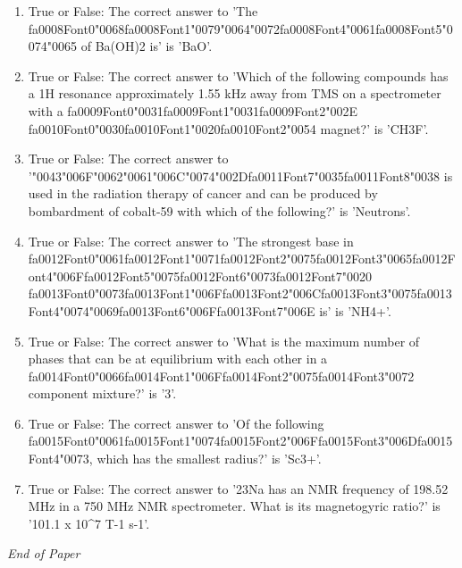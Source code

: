 \documentclass[12pt]{article}
\begin{document}
\begin{enumerate}[label=\arabic*.]
\item True or False: The correct answer to 'The {\csname fa0008Font0\endcsname\char"0068}{\csname fa0008Font1\endcsname\char"0079}{\char"0064}{\char"0072}{\csname fa0008Font4\endcsname\char"0061}{\csname fa0008Font5\endcsname\char"0074}{\char"0065} of Ba(OH)2 is' is 'BaO'.
\item True or False: The correct answer to 'Which of the following compounds has a 1H resonance approximately 1.55 kHz away from TMS on a spectrometer with a {\csname fa0009Font0\endcsname\char"0031}{\csname fa0009Font1\endcsname\char"0031}{\csname fa0009Font2\endcsname\char"002E} {\csname fa0010Font0\endcsname\char"0030}{\csname fa0010Font1\endcsname\char"0020}{\csname fa0010Font2\endcsname\char"0054} magnet?' is 'CH3F'.
\item True or False: The correct answer to '{\char"0043}{\char"006F}{\char"0062}{\char"0061}{\char"006C}{\char"0074}{\char"002D}{\csname fa0011Font7\endcsname\char"0035}{\csname fa0011Font8\endcsname\char"0038} is used in the radiation therapy of cancer and can be produced by bombardment of cobalt-59 with which of the following?' is 'Neutrons'.
\item True or False: The correct answer to 'The strongest base in {\csname fa0012Font0\endcsname\char"0061}{\csname fa0012Font1\endcsname\char"0071}{\csname fa0012Font2\endcsname\char"0075}{\csname fa0012Font3\endcsname\char"0065}{\csname fa0012Font4\endcsname\char"006F}{\csname fa0012Font5\endcsname\char"0075}{\csname fa0012Font6\endcsname\char"0073}{\csname fa0012Font7\endcsname\char"0020} {\csname fa0013Font0\endcsname\char"0073}{\csname fa0013Font1\endcsname\char"006F}{\csname fa0013Font2\endcsname\char"006C}{\csname fa0013Font3\endcsname\char"0075}{\csname fa0013Font4\endcsname\char"0074}{\char"0069}{\csname fa0013Font6\endcsname\char"006F}{\csname fa0013Font7\endcsname\char"006E} is' is 'NH4+'.
\item True or False: The correct answer to 'What is the maximum number of phases that can be at equilibrium with each other in a {\csname fa0014Font0\endcsname\char"0066}{\csname fa0014Font1\endcsname\char"006F}{\csname fa0014Font2\endcsname\char"0075}{\csname fa0014Font3\endcsname\char"0072} component mixture?' is '3'.
\item True or False: The correct answer to 'Of the following {\csname fa0015Font0\endcsname\char"0061}{\csname fa0015Font1\endcsname\char"0074}{\csname fa0015Font2\endcsname\char"006F}{\csname fa0015Font3\endcsname\char"006D}{\csname fa0015Font4\endcsname\char"0073}, which has the smallest radius?' is 'Sc3+'.
\item True or False: The correct answer to '23Na has an NMR frequency of 198.52 MHz in a 750 MHz NMR spectrometer. What is its magnetogyric ratio?' is '101.1 x 10\^{}7 T-1 s-1'.
\end{enumerate}

\vfill
\noindent\textit{End of Paper}
\end{document}
